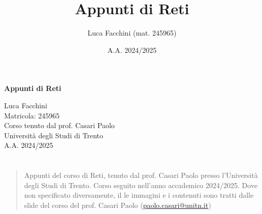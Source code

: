 \documentclass[twoside]{report}
\title{Appunti di Reti}
\author{Luca Facchini (mat. 245965)}
\date{A.A. 2024/2025}
\makeatletter
\renewenvironment{abstract}{%
    \if@twocolumn
        \section*{\abstractname}%
    \else
        \begin{center}%
            {\bfseries \abstractname\vspace{-.5em}\vspace{\z@}}%
        \end{center}%
        \small
        \begin{quotation}
    \fi}
    {\if@twocolumn\else\end{quotation}\fi}
\makeatother
\begin{document}
    \begin{titlepage}
        \centering  %
        {\Huge\textbf{Appunti di Reti}} \\[1cm] %
        \vspace{0.5cm}
        
        {\Large Luca Facchini} \\ %
        \vspace{0.3cm}
        {\large Matricola: 245965} \\[2cm] %
        
        {\large Corso tenuto dal prof. Casari Paolo} \\[0.3cm] %
        {\large Università degli Studi di Trento} \\[1.5cm]
        
        {\large A.A. 2024/2025} \\[3cm] %
        
        \vfill
        \begin{abstract}
            Appunti del corso di Reti, tenuto dal prof. Casari Paolo presso l'Università degli Studi di Trento. Corso seguito nell'anno accademico 2024/2025.\newline
            Dove non specificato diversamente, il le immagini e i contenuti sono tratti dalle slide del corso del prof. Casari Paolo (\href{mailto:paolo.casari@unitn.it}{paolo.casari@unitn.it})
        \end{abstract}
        
        \vfill  %
    \end{titlepage}
    \begingroup
        \pagestyle{tocStyle}
        \tableofcontents
    \endgroup
    \pagestyle{stdPage}
    
    
    
    
    
\end{document}
